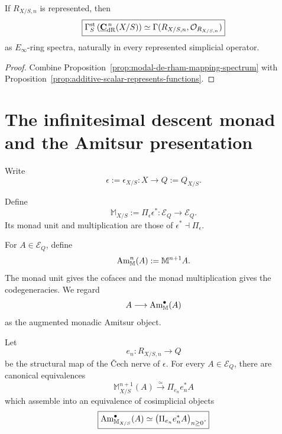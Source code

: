 \begin{proposition}
\label{prop:represented-modal-cochain-functions}
If \(R_{X/S,n}\) is represented, then
\[
\boxed{
    \Gamma_S^{\mathrm{st}}
    \left(
        \underline{\mathbf C}_{\mathrm{dR}}^{\,n}(X/S)
    \right)
    \simeq
    \Gamma(R_{X/S,n},\mathcal O_{R_{X/S,n}})
}
\]
as \(E_\infty\)-ring spectra, naturally in every represented simplicial operator.
\end{proposition}

\begin{proof}
Combine Proposition~\ref{prop:modal-de-rham-mapping-spectrum} with
Proposition~\ref{prop:additive-scalar-represents-functions}.
\end{proof}


\section{The infinitesimal descent monad and the Amitsur presentation}
\label{sec:monadic-de-rham-descent-monad}

Write
\[
    \epsilon:=\epsilon_{X/S}:X\longrightarrow Q:=Q_{X/S}.
\]

\begin{definition}
\label{def:monadic-de-rham-descent-monad}
Define
\[
\boxed{
    \mathbb M_{X/S}:=\Pi_\epsilon\epsilon^*:
    \mathcal E_Q\longrightarrow\mathcal E_Q.
}
\]
Its monad unit and multiplication are those of \(\epsilon^*\dashv\Pi_\epsilon\).
\end{definition}

\begin{definition}
\label{def:monadic-de-rham-amitsur}
For \(A\in\mathcal E_Q\), define
\[
    \operatorname{Am}_{\mathbb M}^n(A):=\mathbb M^{n+1}A.
\]
The monad unit gives the cofaces and the monad multiplication gives the codegeneracies.  We regard
\[
    A\longrightarrow\operatorname{Am}_{\mathbb M}^{\bullet}(A)
\]
as the augmented monadic Amitsur object.
\end{definition}

\begin{theorem}
\label{thm:monadic-de-rham-cech-monad}
Let
\[
    e_n:R_{X/S,n}\longrightarrow Q
\]
be the structural map of the \v{C}ech nerve of \(\epsilon\).  For every \(A\in\mathcal E_Q\), there
are canonical equivalences
\[
\boxed{
    \mathbb M_{X/S}^{n+1}(A)
    \xrightarrow{\simeq}
    \Pi_{e_n}e_n^*A
}
\]
which assemble into an equivalence of cosimplicial objects
\[
\boxed{
    \operatorname{Am}_{\mathbb M_{X/S}}^\bullet(A)
    \simeq
    \bigl(\Pi_{e_n}e_n^*A\bigr)_{n\geq0}.
}
\]
\end{theorem}

